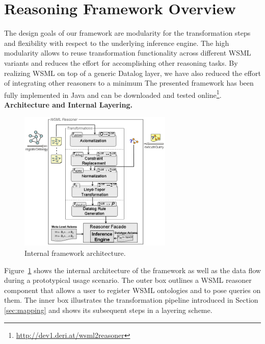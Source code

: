 \section{Reasoning Framework Overview\label{sec:framework}}
The design goals of our framework are modularity for the
transformation steps and flexibility with respect to the
underlying inference engine. The high modularity allows to reuse
transformation functionality across different WSML variants and
reduces the effort for accomplishing other reasoning tasks. By
realizing WSML on top of a generic Datalog layer, we have also
reduced the effort of integrating other reasoners to a
minimum
The presented framework has been fully implemented in Java and can
be downloaded and tested online\footnote{\url{http://dev1.deri.at/wsml2reasoner}}.\\[2mm]
{\bfseries Architecture and Internal Layering.}
\begin{figure}[tb]
    \includegraphics[width=0.65\textwidth]{figures/layering.png}
    \centering
    \caption{Internal framework architecture.
    \label{fig:layering}}\vspace{-5mm}
\end{figure}
Figure~\ref{fig:layering} shows the internal architecture of the
framework as well as the data flow during a prototypical usage
scenario. The outer box outlines a WSML reasoner component that
allows a user to register WSML ontologies and to pose queries on
them. The inner box illustrates the transformation pipeline
introduced in Section \ref{sec:mapping} and shows its subsequent
steps in a layering scheme.

